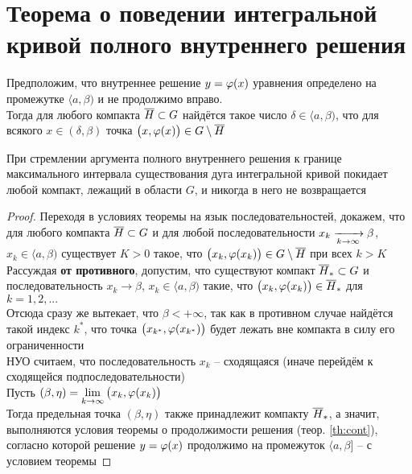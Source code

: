 \section{Теорема о поведении интегральной кривой полного внутреннего решения}

\begin{theorem}
    Предположим, что внутреннее решение $ y = \varphi(x) $ уравнения  определено на промежутке $ \langle a, \beta) $ и не продолжимо вправо. \\
    Тогда для любого компакта $ \overline{H} \subset G $ найдётся такое число $ \delta \in \langle a, \beta) $, что для всякого $ x \in (\delta, \beta) $ точка $ \big( x, \varphi(x) \big) \in G \setminus \overline{H} $
\end{theorem}

\begin{restate}
	При стремлении аргумента полного внутреннего решения к границе максимального интервала существования дуга интегральной кривой покидает любой компакт, лежащий в области $ G $, и никогда в него не возвращается
\end{restate}

\begin{proof}
    Переходя в условиях теоремы на язык последовательностей, докажем, что для любого компакта $ \overline{H} \subset G $ и для любой последовательности $ x_k \xrightarrow[k \to \infty]{} \beta $, $ x_k \in \langle a, \beta) $ существует $ K > 0 $ такое, что $ \big( x_k, \varphi(x_k) \big) \in G \setminus \overline{H} $ при всех $ k > K $ \\
    Рассуждая \textbf{от противного}, допустим, что существуют компакт $ \overline{H}_* \subset G $ и последовательность $ x_k \to \beta $, $ x_k \in \langle a, \beta) $ такие, что $ \big( x_k, \varphi(x_k) \big) \in \overline{H}_* $ для $ k = 1, 2, ... $ \\
    Отсюда сразу же вытекает, что $ \beta < +\infty $, так как в противном случае найдётся такой индекс $ k^* $, что точка $ \big( x_{k^*}, \varphi(x_{k^*}) \big) $ будет лежать вне компакта в силу его ограниченности \\
    НУО считаем, что последовательность $ x_k $ -- сходящаяся (иначе перейдём к сходящейся подпоследовательности) \\
    Пусть $ (\beta, \eta) = \lim\limits_{k\to\infty} \big( x_k, \varphi(x_k) \big) $ \\
    Тогда предельная точка $ (\beta, \eta) $ также принадлежит компакту $ \overline{H}_* $, а значит, выполняются условия теоремы о продолжимости решения (теор. \ref{th:cont}), согласно которой решение $ y = \varphi(x) $ продолжимо на промежуток $ \langle a, \beta] $ -- \contra с условием теоремы
\end{proof}

